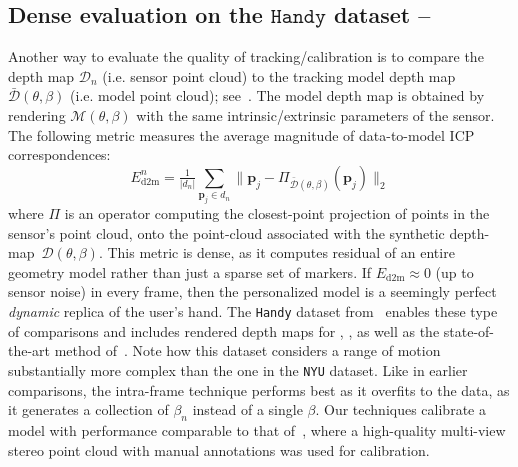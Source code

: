 
\subsection{Dense evaluation on the $\texttt{Handy}$ dataset -- }
\label{sec:evalhandy}
Another way to evaluate the quality of tracking/calibration is to compare the depth map $\mathcal{D}_n$ (i.e. sensor point cloud) to the tracking model depth map $\mathcal{\bar{D}}(\theta,\beta)$ (i.e. model point cloud); see~\cite{tkach2016sphere}. The model depth map is obtained by rendering $\mathcal{M}(\theta,\beta)$ with the same intrinsic/extrinsic parameters of the sensor. The following metric measures the average magnitude of data-to-model ICP correspondences:
% 
\begin{equation}
E_\text{d2m}^n = \tfrac{1}{|d_n|} \sum_{\mathbf{p}_j \in d_n} \| \mathbf{p}_j - \Pi_{\mathcal{\bar{D}}(\theta,\beta)}(\mathbf{p}_j) \|_2
\label{eq:metricd2m}
\end{equation}
% 
where $\Pi$ is an operator computing the closest-point projection of points in the sensor's point cloud, onto the point-cloud associated with the synthetic depth-map~$\mathcal{D}(\theta,\beta)$. This metric is dense, as it computes residual of an entire geometry model rather than just a sparse set of markers. 
If $E_\text{d2m}\approx0$ (up to sensor noise) in every frame, then the personalized model is a seemingly perfect \emph{dynamic} replica of the user's hand. The \texttt{Handy} dataset from~\cite{tkach2016sphere} enables these type of comparisons and includes rendered depth maps for \cite{htrack}, \cite{sharp2015accurate}, as well as the state-of-the-art method of~\cite{taylor2016joint}. Note how this dataset considers a range of motion substantially more complex than the one in the \texttt{NYU} dataset.
% 
Like in earlier comparisons, the intra-frame technique performs best as it overfits to the data, as it generates a collection of $\beta_n$ instead of a single $\beta$. Our techniques calibrate a model with performance comparable to that of~\cite{tkach2016sphere}, where a high-quality multi-view stereo point cloud with manual annotations was used for calibration. 
